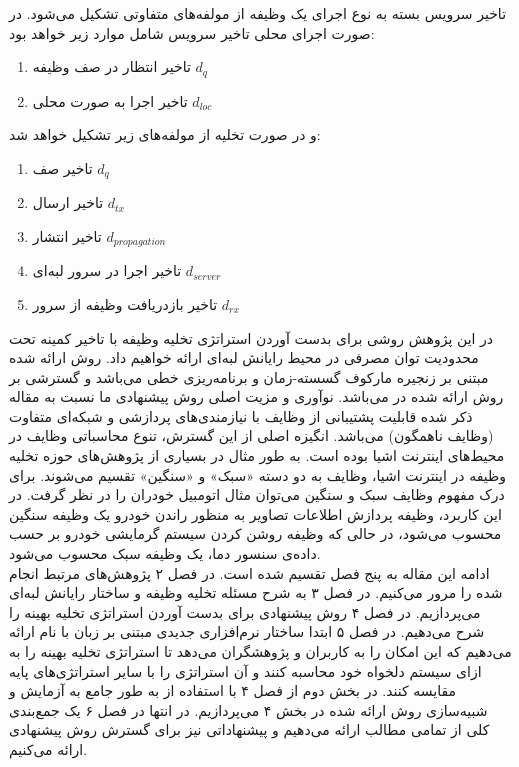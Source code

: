 تاخیر سرویس بسته به نوع اجرای یک وظیفه از مولفه‌های متفاوتی تشکیل می‌شود. در صورت اجرای محلی تاخیر سرویس شامل موارد زیر خواهد بود:
\begin{enumerate}
	\item تاخیر انتظار در صف وظیفه $d_q$
	\item تاخیر اجرا به صورت محلی $d_{l o c}$
\end{enumerate}
و در صورت تخلیه از مولفه‌های زیر تشکیل خواهد شد:
\begin{enumerate}
	\item تاخیر صف $d_q$
	\item تاخیر ارسال $d_{t x}$
	\item تاخیر انتشار $d_{p r o p a g a t i o n}$
	\item تاخیر اجرا در سرور لبه‌ای $d_{s e r v e r}$
	\item تاخیر بازدریافت وظیفه از سرور $d_{r x}$
\end{enumerate}
\newpage
در این پژوهش روشی برای بدست آوردن استراتژی تخلیه وظیفه با تاخیر کمینه تحت محدودیت توان مصرفی در محیط رایانش لبه‌ای ارائه خواهیم داد. روش ارائه شده مبتنی بر زنجیره مارکوف گسسته-زمان و برنامه‌ریزی خطی می‌باشد و گسترشی بر روش ارائه شده در \cite{Liu} می‌باشد. نوآوری و مزیت اصلی روش پیشنهادی ما نسبت به مقاله ذکر شده قابلیت پشتیبانی از وظایف با نیازمندی‌های پردازشی و شبکه‌ای متفاوت (وظایف ناهمگون) می‌باشد. انگیزه اصلی از این گسترش، تنوع محاسباتی وظایف در محیط‌های اینترنت اشیا بوده است. به طور مثال در بسیاری از پژوهش‌های حوزه تخلیه وظیفه در اینترنت اشیا، وظایف به دو دسته «سبک» و «سنگین» تقسیم می‌شوند. \cite{yousefpour} \cite{tran} برای درک مفهوم وظایف سبک و سنگین می‌توان مثال اتومبیل خودران را در نظر گرفت. در این کاربرد، وظیفه پردازش اطلاعات تصاویر به منظور راندن خودرو یک وظیفه سنگین محسوب می‌شود، در حالی که وظیفه‌ روشن کردن سیستم گرمایشی خودرو بر حسب داده‌ی سنسور دما، یک وظیفه سبک محسوب می‌شود. \\

ادامه این مقاله به پنج فصل تقسیم شده است. در فصل ۲ پژوهش‌های مرتبط انجام شده را مرور می‌کنیم. در فصل ۳ به شرح مسئله تخلیه وظیفه و ساختار رایانش لبه‌ای می‌پردازیم. در فصل ۴ روش پیشنهادی برای بدست آوردن استراتژی تخلیه بهینه را شرح می‌دهیم. در فصل ۵ ابتدا ساختار نرم‌افزاری جدیدی مبتنی بر زبان  با نام  ارائه می‌دهیم که این امکان را به کاربران و پژوهشگران می‌دهد تا استراتژی تخلیه بهینه را به ازای سیستم دلخواه خود محاسبه کنند و آن استراتژی را با سایر استراتژی‌های پایه مقایسه کنند. در بخش دوم از فصل ۴ با استفاده از  به طور جامع به آزمایش و شبیه‌سازی روش ارائه شده در بخش ۴ می‌پردازیم. در انتها در فصل ۶ یک جمع‌بندی کلی از تمامی مطالب ارائه می‌دهیم و پیشنهاداتی نیز برای گسترش روش پیشنهادی ارائه می‌کنیم.


\clearpage
